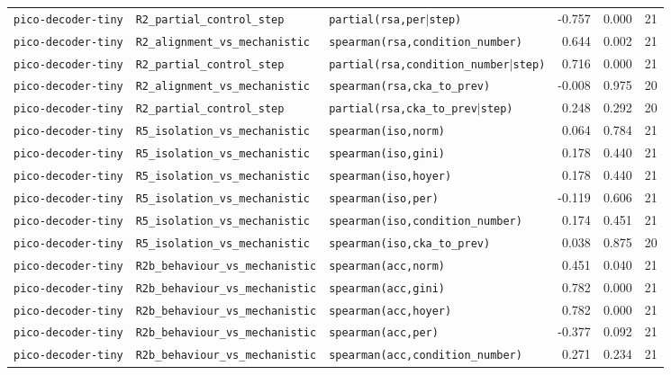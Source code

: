 \begin{longtable}{lllrrr}
\texttt{pico-decoder-tiny} & \texttt{R2\_partial\_control\_step} & \texttt{partial(rsa,per$\mid$step)} & -0.757 & 0.000 & 21 \\
\texttt{pico-decoder-tiny} & \texttt{R2\_alignment\_vs\_mechanistic} & \texttt{spearman(rsa,condition\_number)} & 0.644 & 0.002 & 21 \\
\texttt{pico-decoder-tiny} & \texttt{R2\_partial\_control\_step} & \texttt{partial(rsa,condition\_number$\mid$step)} & 0.716 & 0.000 & 21 \\
\texttt{pico-decoder-tiny} & \texttt{R2\_alignment\_vs\_mechanistic} & \texttt{spearman(rsa,cka\_to\_prev)} & -0.008 & 0.975 & 20 \\
\texttt{pico-decoder-tiny} & \texttt{R2\_partial\_control\_step} & \texttt{partial(rsa,cka\_to\_prev$\mid$step)} & 0.248 & 0.292 & 20 \\
\texttt{pico-decoder-tiny} & \texttt{R5\_isolation\_vs\_mechanistic} & \texttt{spearman(iso,norm)} & 0.064 & 0.784 & 21 \\
\texttt{pico-decoder-tiny} & \texttt{R5\_isolation\_vs\_mechanistic} & \texttt{spearman(iso,gini)} & 0.178 & 0.440 & 21 \\
\texttt{pico-decoder-tiny} & \texttt{R5\_isolation\_vs\_mechanistic} & \texttt{spearman(iso,hoyer)} & 0.178 & 0.440 & 21 \\
\texttt{pico-decoder-tiny} & \texttt{R5\_isolation\_vs\_mechanistic} & \texttt{spearman(iso,per)} & -0.119 & 0.606 & 21 \\
\texttt{pico-decoder-tiny} & \texttt{R5\_isolation\_vs\_mechanistic} & \texttt{spearman(iso,condition\_number)} & 0.174 & 0.451 & 21 \\
\texttt{pico-decoder-tiny} & \texttt{R5\_isolation\_vs\_mechanistic} & \texttt{spearman(iso,cka\_to\_prev)} & 0.038 & 0.875 & 20 \\
\texttt{pico-decoder-tiny} & \texttt{R2b\_behaviour\_vs\_mechanistic} & \texttt{spearman(acc,norm)} & 0.451 & 0.040 & 21 \\
\texttt{pico-decoder-tiny} & \texttt{R2b\_behaviour\_vs\_mechanistic} & \texttt{spearman(acc,gini)} & 0.782 & 0.000 & 21 \\
\texttt{pico-decoder-tiny} & \texttt{R2b\_behaviour\_vs\_mechanistic} & \texttt{spearman(acc,hoyer)} & 0.782 & 0.000 & 21 \\
\texttt{pico-decoder-tiny} & \texttt{R2b\_behaviour\_vs\_mechanistic} & \texttt{spearman(acc,per)} & -0.377 & 0.092 & 21 \\
\texttt{pico-decoder-tiny} & \texttt{R2b\_behaviour\_vs\_mechanistic} & \texttt{spearman(acc,condition\_number)} & 0.271 & 0.234 & 21 \\

\end{longtable}

